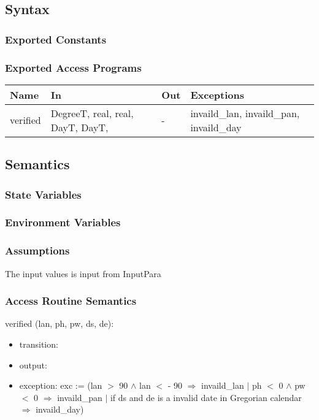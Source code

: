 \documentclass[12pt, titlepage]{article}
\begin{document}
\subsection{Syntax}

\subsubsection{Exported Constants}


\subsubsection{Exported Access Programs}

\begin{center}
\begin{tabular}{p{2cm} p{5cm} p{2cm} p{5cm}}
\hline
\textbf{Name} & \textbf{In} & \textbf{Out} & \textbf{Exceptions} \\
\hline 
verified & DegreeT, real, real, DayT, DayT, & - & invaild\_lan, invaild\_pan, invaild\_day \\
\hline
\end{tabular}
\end{center}


\subsection{Semantics}

\subsubsection{State Variables}



\subsubsection{Environment Variables}


\subsubsection{Assumptions}
The input values is input from InputPara


\subsubsection{ Access Routine Semantics}

\noindent  verified (lan, ph, pw, ds, de):
\begin{itemize}
\item transition: 

\item output:
\item exception: exc := 
(lan $>	$ 90 $\wedge$ lan $<$ - 90 $\Rightarrow$ invaild\_lan
$|$
ph $<$ 0 $\wedge$ pw $<$ 0 $\Rightarrow$ invaild\_pan
$|$
if ds and de is a invalid date in Gregorian calendar $\Rightarrow$ invaild\_day)
\end{itemize}
\end{document}
